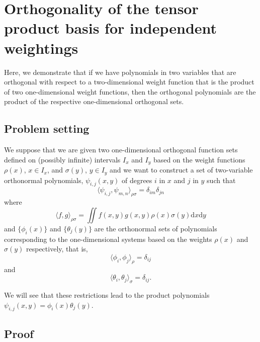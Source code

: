 \documentclass[numbers]{frontiersSCNS}
\newcommand{\diff}{\mathrm{d}}  %
\newcommand{\basisFuncSymbol}{\psi}
\begin{document}
%
%
%
%
%
%





\newpage
\appendix




\section{Orthogonality of the tensor product basis for independent weightings}
\label{sec:appendixProductOrthogonality}

Here, we demonstrate that if we have polynomials in two variables that are orthogonal
with respect to a two-dimensional weight function
that is the product of two one-dimensional weight functions,
then the orthogonal polynomials
are the product of the respective one-dimensional orthogonal sets.


\subsection{Problem setting}
We suppose that we are given two one-dimensional orthogonal function sets
defined on (possibly infinite) intervals $I_x$ and $I_y$
based on the weight functions $\rho(x)$, $x\in I_x$,
and $\sigma(y)$, $y \in I_y$
and we want to construct a set of two-variable orthonormal polynomials,
$\basisFuncSymbol_{i,j} (x, y)$
of degrees $i$ in $x$ and $j$ in $y$
such that
\begin{equation}
    \label{eqn:innerIMJN}
    \langle \basisFuncSymbol_{i,j}, \basisFuncSymbol_{m,n} \rangle_{\rho\sigma} = \delta_{im} \delta_{jn}
\end{equation}
%
where
%
\begin{equation}
    \langle f, g\rangle_{\rho\sigma}
    =
    \iint f(x,y) g(x,y) \rho(x)\sigma(y)\diff x \diff y
\end{equation}
%
and
    $\{\phi_i(x)\}$ and $\{\theta_j(y)\}$
are the orthonormal sets of polynomials corresponding to the
one-dimensional systems based on the weights
$\rho(x)$ and $\sigma(y)$ respectively,
that is,
$$\langle \phi_i, \phi_j \rangle_\rho = \delta_{ij}$$
and
$$\langle \theta_i, \theta_j \rangle_\sigma
=
\delta_{ij}.$$

We will see that these restrictions lead to the product polynomials
$\psi_{i,j}(x,y) = \phi_i(x) \theta_j(y)$.







\subsection{Proof}
\end{document}
